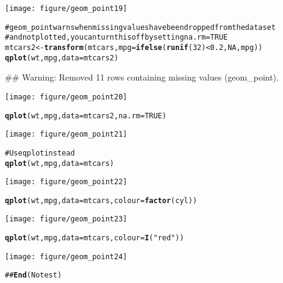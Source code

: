 \documentclass[a4paper,titlepage]{tufte-handout}\usepackage{graphicx, color}
\makeatletter
\def\maxwidth{ %
  \ifdim\Gin@nat@width>\linewidth
    \linewidth
  \else
    \Gin@nat@width
  \fi
}
\newcommand{\hlfunctioncall}[1]{\textcolor[rgb]{0.501960784313725,0,0.329411764705882}{\textbf{#1}}}%
\newcommand{\hlstring}[1]{\textcolor[rgb]{0.6,0.6,1}{#1}}%
\newcommand{\hlcomment}[1]{\textcolor[rgb]{0.180392156862745,0.6,0.341176470588235}{#1}}%
\newenvironment{kframe}{%
 \def\at@end@of@kframe{}%
 \ifinner\ifhmode%
  \def\at@end@of@kframe{\end{minipage}}%
  \begin{minipage}{\columnwidth}%
 \fi\fi%
 \def\FrameCommand##1{\hskip\@totalleftmargin \hskip-\fboxsep
 \colorbox{shadecolor}{##1}\hskip-\fboxsep
     \hskip-\linewidth \hskip-\@totalleftmargin \hskip\columnwidth}%
 \MakeFramed {\advance\hsize-\width
   \@totalleftmargin\z@ \linewidth\hsize
   \@setminipage}}%
 {\par\unskip\endMakeFramed%
 \at@end@of@kframe}
\newenvironment{knitrout}{}{} %
\makeatother
\begin{document}
\begin{knitrout}
\begin{kframe}
\begin{alltt}
\end{alltt}
\end{kframe}\texttt{[image: figure/geom\_point19]} \begin{kframe}\begin{alltt}
\hlcomment{# geom_point warns when missing values have been dropped from the data set}
\hlcomment{# and not plotted, you can turn this off by setting na.rm = TRUE}
mtcars2 <- \hlfunctioncall{transform}(mtcars, mpg = \hlfunctioncall{ifelse}(\hlfunctioncall{runif}(32) < 0.2, NA, mpg))
\hlfunctioncall{qplot}(wt, mpg, data = mtcars2)
\end{alltt}
\begin{flushleft}\ttfamily\noindent\textcolor{warningcolor}{\#\# Warning: Removed 11 rows containing missing values (geom\_point).}\end{flushleft}\end{kframe}\texttt{[image: figure/geom\_point20]} \begin{kframe}\begin{alltt}
\hlfunctioncall{qplot}(wt, mpg, data = mtcars2, na.rm = TRUE)
\end{alltt}
\end{kframe}\texttt{[image: figure/geom\_point21]} \begin{kframe}\begin{alltt}
\hlcomment{# Use qplot instead}
\hlfunctioncall{qplot}(wt, mpg, data = mtcars)
\end{alltt}
\end{kframe}\texttt{[image: figure/geom\_point22]} \begin{kframe}\begin{alltt}
\hlfunctioncall{qplot}(wt, mpg, data = mtcars, colour = \hlfunctioncall{factor}(cyl))
\end{alltt}
\end{kframe}\texttt{[image: figure/geom\_point23]} \begin{kframe}\begin{alltt}
\hlfunctioncall{qplot}(wt, mpg, data = mtcars, colour = \hlfunctioncall{I}(\hlstring{"red"}))
\end{alltt}
\end{kframe}\texttt{[image: figure/geom\_point24]} \begin{kframe}\begin{alltt}
\hlcomment{## \hlfunctioncall{End}(No test)}
\end{alltt}
\end{kframe}
\end{knitrout}
\end{document}
